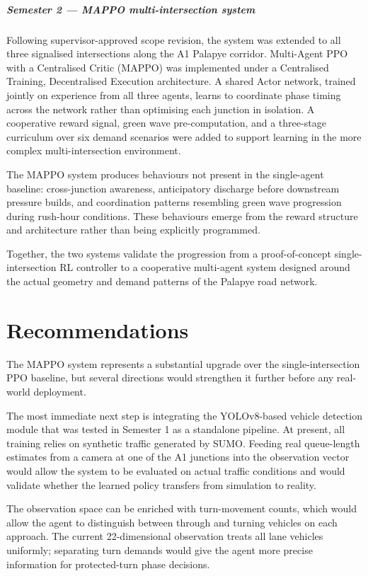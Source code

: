 \documentclass[11pt, a4paper]{report}
\begin{document}
\paragraph{Semester 2 --- MAPPO multi-intersection system}

Following supervisor-approved scope revision, the system was extended to all three signalised intersections along the A1 Palapye corridor. Multi-Agent PPO with a Centralised Critic (MAPPO) was implemented under a Centralised Training, Decentralised Execution architecture. A shared Actor network, trained jointly on experience from all three agents, learns to coordinate phase timing across the network rather than optimising each junction in isolation. A cooperative reward signal, green wave pre-computation, and a three-stage curriculum over six demand scenarios were added to support learning in the more complex multi-intersection environment.

The MAPPO system produces behaviours not present in the single-agent baseline: cross-junction awareness, anticipatory discharge before downstream pressure builds, and coordination patterns resembling green wave progression during rush-hour conditions. These behaviours emerge from the reward structure and architecture rather than being explicitly programmed.

Together, the two systems validate the progression from a proof-of-concept single-intersection RL controller to a cooperative multi-agent system designed around the actual geometry and demand patterns of the Palapye road network.

\chapter{Recommendations}

The MAPPO system represents a substantial upgrade over the single-intersection PPO baseline, but several directions would strengthen it further before any real-world deployment.

The most immediate next step is integrating the YOLOv8-based vehicle detection module that was tested in Semester 1 as a standalone pipeline. At present, all training relies on synthetic traffic generated by SUMO. Feeding real queue-length estimates from a camera at one of the A1 junctions into the observation vector would allow the system to be evaluated on actual traffic conditions and would validate whether the learned policy transfers from simulation to reality.

The observation space can be enriched with turn-movement counts, which would allow the agent to distinguish between through and turning vehicles on each approach. The current 22-dimensional observation treats all lane vehicles uniformly; separating turn demands would give the agent more precise information for protected-turn phase decisions.
\end{document}
